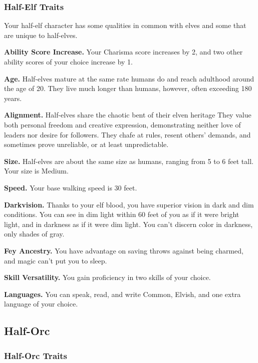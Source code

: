 \hypertarget{half-elf-traits}{%
\subsubsection{Half-Elf Traits}\label{half-elf-traits}}

Your half-elf character has some qualities in common with elves and some
that are unique to half-elves.

\textbf{Ability Score Increase.} Your Charisma score increases by 2, and
two other ability scores of your choice increase by 1.

\textbf{Age.} Half-elves mature at the same rate humans do and reach
adulthood around the age of 20. They live much longer than humans,
however, often exceeding 180 years.

\textbf{Alignment.} Half-elves share the chaotic bent of their elven
heritage They value both personal freedom and creative expression,
demonstrating neither love of leaders nor desire for followers. They
chafe at rules, resent others' demands, and sometimes prove unreliable,
or at least unpredictable.

\textbf{Size.} Half-elves are about the same size as humans, ranging
from 5 to 6 feet tall. Your size is Medium.

\textbf{Speed.} Your base walking speed is 30 feet.

\textbf{Darkvision.} Thanks to your elf blood, you have superior vision
in dark and dim conditions. You can see in dim light within 60 feet of
you as if it were bright light, and in darkness as if it were dim light.
You can't discern color in darkness, only shades of gray.

\textbf{Fey Ancestry.} You have advantage on saving throws against being
charmed, and magic can't put you to sleep.

\textbf{Skill Versatility.} You gain proficiency in two skills of your
choice.

\textbf{Languages.} You can speak, read, and write Common, Elvish, and
one extra language of your choice.

\hypertarget{half-orc}{%
\subsection{Half-Orc}\label{half-orc}}

\hypertarget{half-orc-traits}{%
\subsubsection{Half-Orc Traits}\label{half-orc-traits}}

